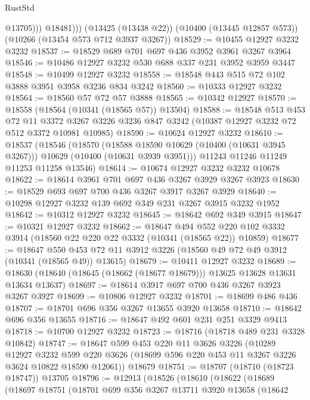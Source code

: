 \begin{lexlean}{RustStd}
\begin{coremodule}
                @13705)))
          @18481)))
    (@13425 (@13438 @22))
    (@10400 (@13445 @12857 @573))
    (@10266 (@13454 @573 @712 @3937 @3267))
@18529 := @10455 @12927 @3232 @3232
@18537 := @18529 @689 @701 @697 @436 @3952 @3961 @3267 @3964
@18546 := @10486 @12927 @3232 @530 @688 @337 @231 @3952 @3959 @3447
@18548 := @10499 @12927 @3232
@18558 := @18548 @443 @515 @72 @102 @3888 @3951 @3958 @3236 @834 @3242
@18560 := @10333 @12927 @3232
@18564 := @18560 @57 @72 @57 @3888
@18565 := @10342 @12927
@18570 := @18558 (@18564 (@10341 (@18565 @57)) @13504)
@18588 := @18548
    @513
    @453
    @72
    @11
    @3372
    @3267
    @3226
    @3236
    @847
    @3242
    (@10387 @12927 @3232 @72 @512 @3372 @10981 @10985)
@18590 := @10624 @12927 @3232
@18610 := @18537
    (@18546
      (@18570
        (@18588 @18590 @10629 (@10400 (@10631 @3945 @3267)))
        @10629
        (@10400 (@10631 @3939 @3951)))
      @11243
      @11246
      @11249
      @11253
      @11258
      @13546)
@18614 := @10674 @12927 @3232 @3232 @10678
@18622 := @18614 @3961 @701 @697 @436 @3267 @3929 @3267 @3923
@18630 := @18529 @693 @697 @700 @436 @3267 @3917 @3267 @3929
@18640 := @10298 @12927 @3232 @139 @692 @349 @231 @3267 @3915 @3232 @1952
@18642 := @10312 @12927 @3232
@18645 := @18642 @692 @349 @3915
@18647 := @10321 @12927 @3232
@18662 := @18647
    @494
    @552
    @220
    @102
    @3332
    @3914
    (@18560 @22 @220 @22 @3332 (@10341 (@18565 @22)) @10859)
@18677 := @18647
    @550
    @453
    @72
    @11
    @3912
    @3226
    (@18560 @49 @72 @49 @3912 (@10341 (@18565 @49)) @13615)
@18679 := @10411 @12927 @3232
@18689 := @18630 (@18640 (@18645 (@18662 (@18677 @18679))) @13625 @13628 @13631 @13634 @13637)
@18697 := @18614 @3917 @697 @700 @436 @3267 @3923 @3267 @3927
@18699 := @10806 @12927 @3232
@18701 := @18699 @486 @436
@18707 := @18701 @696 @356 @3267 @13655 @3920 @13658
@18710 := @18642 @696 @356 @13655
@18716 := @18647 @492 @601 @231 @251 @3329 @9413
@18718 := @10700 @12927 @3232
@18723 := @18716 (@18718 @489 @231 @3328 @10842)
@18747 := @18647
    @599
    @453
    @220
    @11
    @3626
    @3226
    (@10289
      @12927
      @3232
      @599
      @220
      @3626
      (@18699 @596 @220 @453 @11 @3267 @3226 @3624 @10822 @18590 @12061))
    @18679
@18751 := @18707 (@18710 (@18723 @18747)) @13705
@18796 := @12913
    (@18526
      (@18610
        (@18622
          (@18689
            (@18697
              @18751
              (@18701
                @699
                @356
                @3267
                @13711
                @3920
                @13658
                (@18642

\end{coremodule}
\end{lexlean}
